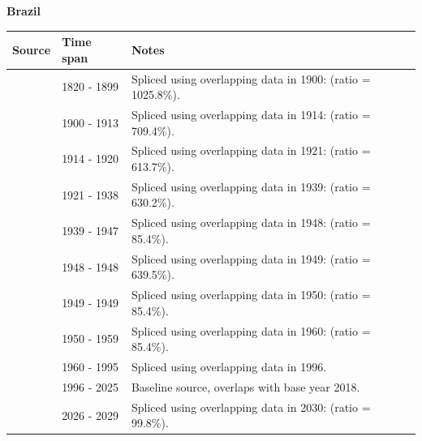 \documentclass[12pt,a4paper,landscape]{article}
\begin{document}
\begin{adjustbox}{max totalsize={\paperwidth}{\paperheight},center}
\begin{minipage}[t][\textheight][t]{\textwidth}
\vspace*{0.5cm}
{}
\begin{center}
{\Large\bfseries Brazil}
\end{center}
\vspace{0.5cm}
\begin{table}[H]
\centering
\small
\begin{tabular}{|l|l|l|}
\hline
\textbf{Source} & \textbf{Time span} & \textbf{Notes} \\
\hline
\rowcolor{white}\cite{Tena}& 1820 - 1899 &Spliced using overlapping data in 1900: (ratio = 1025.8\%).\\
\rowcolor{lightgray}\cite{UN_trade}& 1900 - 1913 &Spliced using overlapping data in 1914: (ratio = 709.4\%).\\
\rowcolor{white}\cite{Tena}& 1914 - 1920 &Spliced using overlapping data in 1921: (ratio = 613.7\%).\\
\rowcolor{lightgray}\cite{UN_trade}& 1921 - 1938 &Spliced using overlapping data in 1939: (ratio = 630.2\%).\\
\rowcolor{white}\cite{Mitchell}& 1939 - 1947 &Spliced using overlapping data in 1948: (ratio = 85.4\%).\\
\rowcolor{lightgray}\cite{UN_trade}& 1948 - 1948 &Spliced using overlapping data in 1949: (ratio = 639.5\%).\\
\rowcolor{white}\cite{Mitchell}& 1949 - 1949 &Spliced using overlapping data in 1950: (ratio = 85.4\%).\\
\rowcolor{lightgray}\cite{UN_trade}& 1950 - 1959 &Spliced using overlapping data in 1960: (ratio = 85.4\%).\\
\rowcolor{white}\cite{WDI}& 1960 - 1995 &Spliced using overlapping data in 1996.\\
\rowcolor{lightgray}\cite{OECD_EO}& 1996 - 2025 &Baseline source, overlaps with base year 2018.\\
\rowcolor{white}\cite{IMF_WEO_forecast}& 2026 - 2029 &Spliced using overlapping data in 2030: (ratio = 99.8\%).\\
\hline
\end{tabular}
\end{table}
\begin{figure}[H]
\centering

\end{figure}
\end{minipage}
\end{adjustbox}
\end{document}
